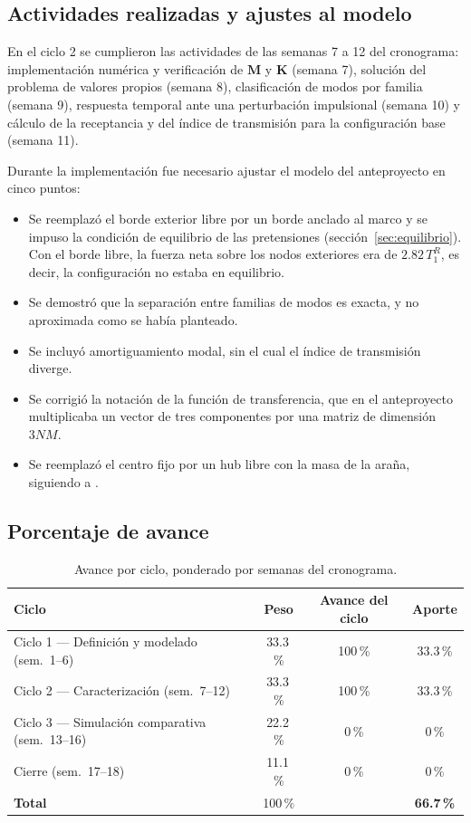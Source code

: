 \documentclass[11pt,letterpaper]{article}
\begin{document}
\subsection{Actividades realizadas y ajustes al modelo}

En el ciclo 2 se cumplieron las actividades de las semanas 7 a 12 del
cronograma: implementación numérica y verificación de $\mathbf{M}$ y
$\mathbf{K}$ (semana 7), solución del problema de valores propios (semana 8),
clasificación de modos por familia (semana 9), respuesta temporal ante una
perturbación impulsional (semana 10) y cálculo de la receptancia y del
índice de transmisión para la configuración base (semana 11).

Durante la implementación fue necesario ajustar el modelo del anteproyecto
en cinco puntos:
\begin{itemize}
    \item Se reemplazó el borde exterior libre por un borde anclado al marco
    y se impuso la condición de equilibrio de las pretensiones
    (sección~\ref{sec:equilibrio}). Con el borde libre, la fuerza neta sobre
    los nodos exteriores era de $2.82\,T^R_1$, es decir, la configuración no
    estaba en equilibrio.
    \item Se demostró que la separación entre familias de modos es exacta, y
    no aproximada como se había planteado.
    \item Se incluyó amortiguamiento modal, sin el cual el índice de
    transmisión diverge.
    \item Se corrigió la notación de la función de transferencia, que en el
    anteproyecto multiplicaba un vector de tres componentes por una matriz de
    dimensión $3NM$.
    \item Se reemplazó el centro fijo por un hub libre con la masa de la
    araña, siguiendo a \cite{yavuz2024}.
\end{itemize}

\subsection{Porcentaje de avance}\label{sec:porcentaje}

\begin{table}[H]
\centering\small
\caption{Avance por ciclo, ponderado por semanas del cronograma.}
\begin{tabular}{@{}lccc@{}}
\toprule
Ciclo & Peso & Avance del ciclo & Aporte \\
\midrule
Ciclo 1 --- Definición y modelado (sem.\ 1--6) & 33.3\,\% & 100\,\% & 33.3\,\% \\
Ciclo 2 --- Caracterización (sem.\ 7--12) & 33.3\,\% & 100\,\% & 33.3\,\% \\
Ciclo 3 --- Simulación comparativa (sem.\ 13--16) & 22.2\,\% & 0\,\% & 0\,\% \\
Cierre (sem.\ 17--18) & 11.1\,\% & 0\,\% & 0\,\% \\
\midrule
\textbf{Total} & 100\,\% & & \textbf{66.7\,\%} \\
\bottomrule
\end{tabular}
\end{table}
\end{document}
